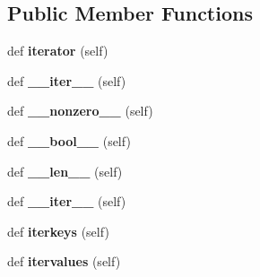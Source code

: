 \subsection*{Public Member Functions}
\begin{DoxyCompactItemize}
\item 
def {\bfseries iterator} (self)\hypertarget{classsbol_1_1libsbol_1_1___map_vector_aecc7225ec0f27106c0d58aa1a36c7e8f}{}\label{classsbol_1_1libsbol_1_1___map_vector_aecc7225ec0f27106c0d58aa1a36c7e8f}

\item 
def {\bfseries \+\_\+\+\_\+iter\+\_\+\+\_\+} (self)\hypertarget{classsbol_1_1libsbol_1_1___map_vector_a0fcda17ea072904e960bfd351f7be988}{}\label{classsbol_1_1libsbol_1_1___map_vector_a0fcda17ea072904e960bfd351f7be988}

\item 
def {\bfseries \+\_\+\+\_\+nonzero\+\_\+\+\_\+} (self)\hypertarget{classsbol_1_1libsbol_1_1___map_vector_a221a75ba12afa8e57f61c01e548e4327}{}\label{classsbol_1_1libsbol_1_1___map_vector_a221a75ba12afa8e57f61c01e548e4327}

\item 
def {\bfseries \+\_\+\+\_\+bool\+\_\+\+\_\+} (self)\hypertarget{classsbol_1_1libsbol_1_1___map_vector_aeac185aef4ddfacd74c4c6004079bffd}{}\label{classsbol_1_1libsbol_1_1___map_vector_aeac185aef4ddfacd74c4c6004079bffd}

\item 
def {\bfseries \+\_\+\+\_\+len\+\_\+\+\_\+} (self)\hypertarget{classsbol_1_1libsbol_1_1___map_vector_ad43822a639e43cdf6ecbfc6b17f4ed08}{}\label{classsbol_1_1libsbol_1_1___map_vector_ad43822a639e43cdf6ecbfc6b17f4ed08}

\item 
def {\bfseries \+\_\+\+\_\+iter\+\_\+\+\_\+} (self)\hypertarget{classsbol_1_1libsbol_1_1___map_vector_a0fcda17ea072904e960bfd351f7be988}{}\label{classsbol_1_1libsbol_1_1___map_vector_a0fcda17ea072904e960bfd351f7be988}

\item 
def {\bfseries iterkeys} (self)\hypertarget{classsbol_1_1libsbol_1_1___map_vector_a0d2126a19a7c71b682234f3a13723efe}{}\label{classsbol_1_1libsbol_1_1___map_vector_a0d2126a19a7c71b682234f3a13723efe}

\item 
def {\bfseries itervalues} (self)\hypertarget{classsbol_1_1libsbol_1_1___map_vector_a54b0fb7d6330f17d6c67a8c768262c85}{}\label{classsbol_1_1libsbol_1_1___map_vector_a54b0fb7d6330f17d6c67a8c768262c85}


\end{DoxyCompactItemize}
